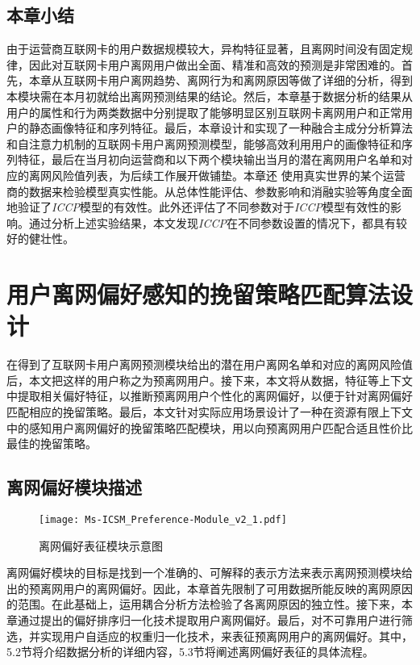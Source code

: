 \subsection{本章小结}
由于运营商互联网卡的用户数据规模较大，异构特征显著，且离网时间没有固定规律，因此对互联网卡用户离网用户做出全面、精准和高效的预测是非常困难的。首先，本章从互联网卡用户离网趋势、离网行为和离网原因等做了详细的分析，得到本模块需在本月初就给出离网预测结果的结论。然后，本章基于数据分析的结果从用户的属性和行为两类数据中分别提取了能够明显区别互联网卡离网用户和正常用户的静态画像特征和序列特征。最后，本章设计和实现了一种融合主成分分析算法和自注意力机制的互联网卡用户离网预测模型，能够高效利用用户的画像特征和序列特征，最后在当月初向运营商和以下两个模块输出当月的潜在离网用户名单和对应的离网风险值列表，为后续工作展开做铺垫。本章还
使用真实世界的某个运营商的数据来检验模型真实性能。从总体性能评估、参数影响和消融实验等角度全面地验证了\emph{ICCP}模型的有效性。此外还评估了不同参数对于\emph{ICCP}模型有效性的影响。通过分析上述实验结果，本文发现\emph{ICCP}在不同参数设置的情况下，都具有较好的健壮性。
\newpage

\section{用户离网偏好感知的挽留策略匹配算法设计}
在得到了互联网卡用户离网预测模块给出的潜在用户离网名单和对应的离网风险值后，本文把这样的用户称之为预离网用户。接下来，本文将从数据，特征等上下文中提取相关偏好特征，以推断预离网用户个性化的离网偏好，以便于针对离网偏好匹配相应的挽留策略。最后，本文针对实际应用场景设计了一种在资源有限上下文中的感知用户离网偏好的挽留策略匹配模块，用以向预离网用户匹配合适且性价比最佳的挽留策略。

\subsection{离网偏好模块描述}

\begin{figure}[hbt]
	\centering
	\texttt{[image: Ms-ICSM\_Preference-Module\_v2\_1.pdf]}
	\caption{离网偏好表征模块示意图}
	\label{Fig:Preference-Module}
\end{figure}

离网偏好模块的目标是找到一个准确的、可解释的表示方法来表示离网预测模块给出的预离网用户的离网偏好。因此，本章首先限制了可用数据所能反映的离网原因的范围。在此基础上，运用耦合分析方法检验了各离网原因的独立性。接下来，本章通过提出的偏好排序归一化技术提取用户离网偏好。最后，对不可靠用户进行筛选，并实现用户自适应的权重归一化技术，来表征预离网用户的离网偏好。其中，5.2节将介绍数据分析的详细内容，5.3节将阐述离网偏好表征的具体流程。

